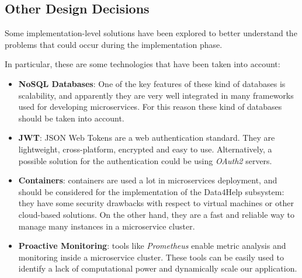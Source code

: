 \subsection{Other Design Decisions}
Some implementation-level solutions have been explored to better understand the problems that could occur during the implementation phase.

In particular, these are some technologies that have been taken into account:

\begin{itemize}
	\item \textbf{NoSQL Databases}: One of the key features of these kind of databases is scalability, and apparently they are very well integrated in many frameworks used for developing microservices. For this reason these kind of databases should be taken into account.
	\item \textbf{JWT}: JSON Web Tokens are a web authentication standard. They are lightweight, cross-platform, encrypted and easy to use. Alternatively, a possible solution for the authentication could be using \textit{OAuth2} servers.
	\item \textbf{Containers}: containers are used a lot in microservices deployment, and should be considered for the implementation of the Data4Help subsystem: they have some security drawbacks with respect to virtual machines or other cloud-based solutions. On the other hand, they are a fast and reliable way to manage many instances in a microservice cluster.
	\item \textbf{Proactive Monitoring}: tools like \textit{Prometheus} enable metric analysis and monitoring inside a microservice cluster. These tools can be easily used to identify a lack of computational power and dynamically scale our application.
\end{itemize}